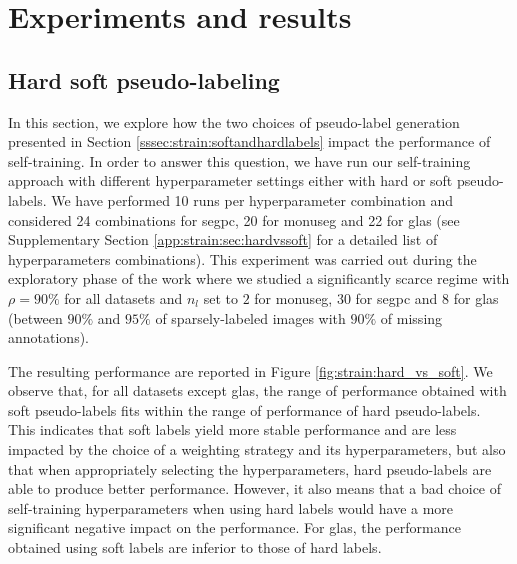 
\section{Experiments and results}
\label{sec:strain:results}

\subsection{Hard \vs soft pseudo-labeling}
\label{ssec:strain:res:hardvssoft}


In this section, we explore how the two choices of pseudo-label generation presented in Section \ref{sssec:strain:softandhardlabels} impact the performance of self-training. In order to answer this question, we have run our self-training approach with different hyperparameter settings either with hard or soft pseudo-labels. We have performed 10 runs per hyperparameter combination and considered 24 combinations for \acrshort{segpc}, 20 for \acrshort{monuseg} and 22 for \acrshort{glas} (see Supplementary Section \ref{app:strain:sec:hardvssoft} for a detailed list of hyperparameters combinations). This experiment was carried out during the exploratory phase of the work where we studied a significantly scarce regime with $\rho = 90\%$ for all datasets and $n_l$ set to $2$ for \acrshort{monuseg}, $30$ for \acrshort{segpc} and $8$ for \acrshort{glas} (\ie between $90\%$ and $95\%$ of sparsely-labeled images with $90\%$ of missing annotations).

The resulting performance are reported in Figure \ref{fig:strain:hard_vs_soft}. We observe that, for all datasets except \acrshort{glas}, the range of performance obtained with soft pseudo-labels fits within the range of performance of hard pseudo-labels. This indicates that soft labels yield more stable performance and are less impacted by the choice of a weighting strategy and its hyperparameters, but also that when appropriately selecting the hyperparameters, hard pseudo-labels are able to produce better performance. However, it also means that a bad choice of self-training hyperparameters when using hard labels would have a more significant negative impact on the performance. For \acrshort{glas}, the performance obtained using soft labels are inferior to those of hard labels. 


